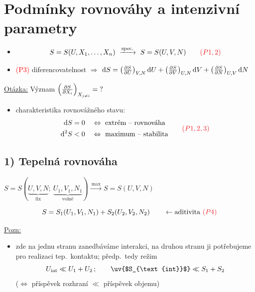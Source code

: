 \providecommand{\cancel}[1]{\tikz[baseline=(c.base)]{\node[inner sep=0pt](c){$#1$};\draw[NavyBlue](c.south west)--(c.north east);}}
\section{Podmínky rovnováhy a intenzivní parametry}

\begin{itemize}
  \item {}
  \[
    S = S(U, X_1,\dots,X_n) \ \xrightarrow{\text{spec.}}\ S = S(U,V,N) \qquad \textcolor{Red}{(P1,2)}
  \]
  \item \textcolor{Red}{(P3)} diferencovatelnost $\Rightarrow$ \quad
  $\dd S = \left(\pdv{S}{U}\right)_{V,N}\dd U + \left(\pdv{S}{V}\right)_{U,N}\dd V + \left(\pdv{S}{N}\right)_{U,V}\dd N$
\end{itemize}

\underline{Otázka:} \quad Význam $\left(\pdv{S}{X_i}\right)_{X_{j\neq i}} = \;?$

\begin{itemize}
  \item charakteristika rovnovážného stavu:
  \[
    \begin{aligned}
      \dd S &= 0 &&\Leftrightarrow\ \text{extrém -- rovnováha} \\
      \dd^2 S &< 0 &&\Leftrightarrow\ \text{maximum -- stabilita}
    \end{aligned}
    \qquad \textcolor{Red}{(P1,2,3)}
  \]
\end{itemize}

\subsection*{1) Tepelná rovnováha}
\hfill \textcolor{NavyBlue}{$S = S(\underbrace{U,V,N}_{\text{fix}};\ \underbrace{U_1,V_1,N_1}_{\text{volné}}) \xrightarrow{\ \max\ } S = S(U,V,N)$}

\[
  S = S_1(U_1,V_1,N_1) + S_2(U_2,V_2,N_2) \qquad \leftarrow \text{aditivita } \textcolor{Red}{(P4)}
\]

\underline{Pozn:}
\begin{itemize}[nosep]
  \item zde na jednu stranu zanedbáváme interakci, na druhou stranu ji potřebujeme pro realizaci tep.\ kontaktu; předp.\ tedy režim
  \[
    U_{\text{int}} \ll U_1 + U_2\,; \qquad \text{\uv{$S_{\text{int}}$}} \ll S_1 + S_2
  \]
  ($\Leftrightarrow$ příspěvek rozhraní $\ll$ příspěvek objemu)
\end{itemize}

